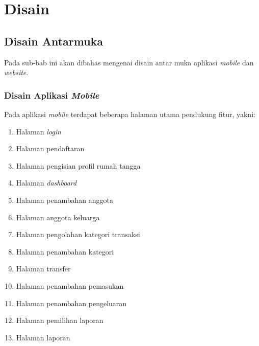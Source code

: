 \chapter{Disain}
\label{chap:disain}

\section{Disain Antarmuka}
\label{sec:disainantarmuka}

\hspace{0,5cm}Pada sub-bab ini akan dibahas mengenai disain antar muka aplikasi \textit{mobile} dan \textit{website}.

\subsection{Disain Aplikasi \textit{Mobile}}
\label{subsec:disainaplikasimobile}

\hspace{0,5cm}Pada aplikasi \textit{mobile} terdapat beberapa halaman utama pendukung fitur, yakni:
\begin{enumerate}
	\item Halaman \textit{login}
	\item	Halaman pendaftaran
	\item Halaman pengisian profil rumah tangga
	\item Halaman \textit{dashboard}
	\item Halaman penambahan anggota
	\item Halaman anggota keluarga
	\item Halaman pengolahan kategori transaksi
	\item Halaman penambahan kategori
	\item Halaman transfer
	\item Halaman penambahan pemasukan
	\item Halaman penambahan pengeluaran
	\item Halaman pemilihan laporan
	\item Halaman laporan
\end{enumerate}

